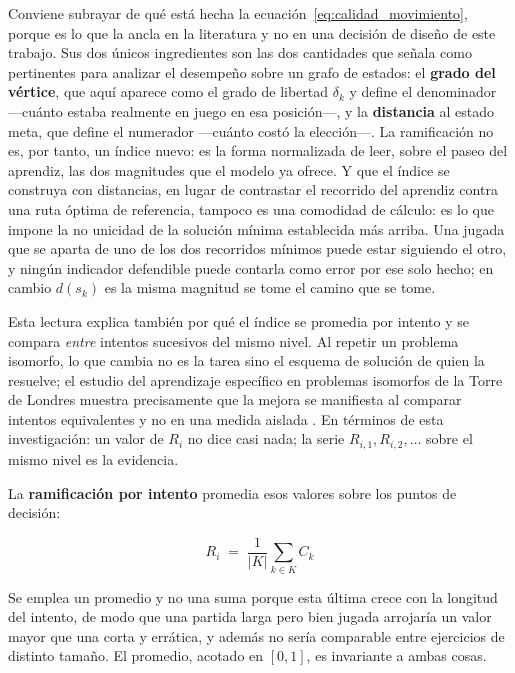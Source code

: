 \documentclass{book}
\begin{document}
Conviene subrayar de qué está hecha la ecuación~\ref{eq:calidad_movimiento},
porque es lo que la ancla en la literatura y no en una decisión de
diseño de este trabajo. Sus dos únicos ingredientes son las dos
cantidades que \cite{Hinz2012} señala como pertinentes para analizar
el desempeño sobre un grafo de estados: el \textbf{grado del
vértice}, que aquí aparece como el grado de libertad $\delta_k$ y
define el denominador —cuánto estaba realmente en juego en esa
posición—, y la \textbf{distancia} al estado meta, que define el
numerador —cuánto costó la elección—. La ramificación no es, por
tanto, un índice nuevo: es la forma normalizada de leer, sobre el
paseo del aprendiz, las dos magnitudes que el modelo ya ofrece.
Y que el índice se construya con distancias, en lugar de contrastar el
recorrido del aprendiz contra una ruta óptima de referencia, tampoco es
una comodidad de cálculo: es lo que impone la no unicidad de la solución
mínima establecida más arriba. Una jugada que se aparta de uno de los
dos recorridos mínimos puede estar siguiendo el otro, y ningún
indicador defendible puede contarla como error por ese solo hecho; en
cambio $d(s_k)$ es la misma magnitud se tome el camino que se tome.

Esta lectura explica también por qué el índice se promedia por
intento y se compara \textit{entre} intentos sucesivos del mismo
nivel. Al repetir un problema isomorfo, lo que cambia no es la
tarea sino el esquema de solución de quien la resuelve; el estudio
del aprendizaje específico en problemas isomorfos de la Torre de
Londres muestra precisamente que la mejora se manifiesta al
comparar intentos equivalentes y no en una medida aislada
\cite{HinzFaber2009}. En términos de esta investigación: un valor
de $R_i$ no dice casi nada; la serie $R_{i,1}, R_{i,2}, \ldots$
sobre el mismo nivel es la evidencia.

La \textbf{ramificación por intento} promedia esos valores sobre los
puntos de decisión:

\begin{equation}
    R_i \;=\; \frac{1}{|K|}\sum_{k \in K} C_k
    \label{eq:ramif_intento}
\end{equation}

Se emplea un promedio y no una suma porque esta última crece con la
longitud del intento, de modo que una partida larga pero bien
jugada arrojaría un valor mayor que una corta y errática, y además
no sería comparable entre ejercicios de distinto tamaño. El
promedio, acotado en $[0,1]$, es invariante a ambas cosas.
\end{document}
